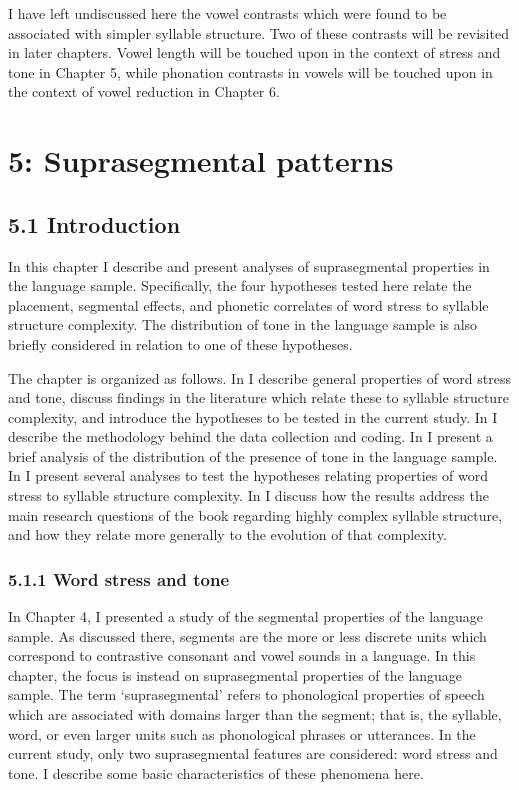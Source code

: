   I have left undiscussed here the vowel contrasts which were found to be associated with simpler syllable structure. Two of these contrasts will be revisited in later chapters. Vowel length will be touched upon in the context of stress and tone in Chapter 5, while phonation contrasts in vowels will be touched upon in the context of vowel reduction in Chapter 6.

\chapter{5: Suprasegmental patterns}
\section{\textbf{5.1} \textbf{Introduction}}

  In this chapter I describe and present analyses of suprasegmental properties in the language sample. Specifically, the four hypotheses tested here relate the placement, segmental effects, and phonetic correlates of word stress to syllable structure complexity. The distribution of tone in the language sample is also briefly considered in relation to one of these hypotheses.

  The chapter is organized as follows. In  I describe general properties of word stress and tone, discuss findings in the literature which relate these to syllable structure complexity, and introduce the hypotheses to be tested in the current study. In  I describe the methodology behind the data collection and coding. In  I present a brief analysis of the distribution of the presence of tone in the language sample. In  I present several analyses to test the hypotheses relating properties of word stress to syllable structure complexity. In  I discuss how the results address the main research questions of the book regarding highly complex syllable structure, and how they relate more generally to the evolution of that complexity.

\subsection{5.1.1 Word stress and tone}

  In Chapter 4, I presented a study of the segmental properties of the language sample. As discussed there, segments are the more or less discrete units which correspond to contrastive consonant and vowel sounds in a language. In this chapter, the focus is instead on suprasegmental properties of the language sample. The term ‘suprasegmental’ refers to phonological properties of speech which are associated with domains larger than the segment; that is, the syllable, word, or even larger units such as phonological phrases or utterances. In the current study, only two suprasegmental features are considered: word stress and tone. I describe some basic characteristics of these phenomena here.


